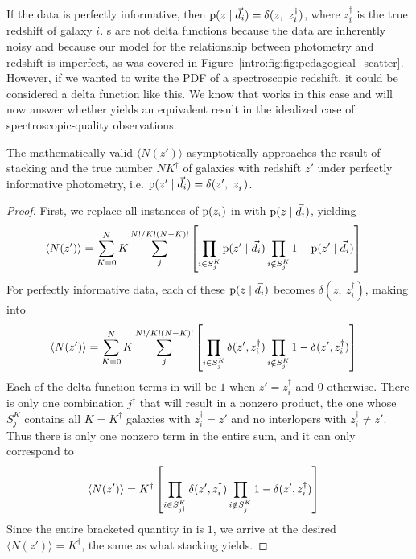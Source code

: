 If the data is perfectly informative, then $\pr{z \gvn \data_{i}} = \delta(z,\ z_{i}^{\dagger})$, where $z_{i}^{\dagger}$ is the true redshift of galaxy $i$.
\Pzpdf s are not delta functions because the data are inherently noisy and because our model for the relationship between photometry and redshift is imperfect, as was covered in Figure~\ref{intro:fig:fig:pedagogical_scatter}.
However, if we wanted to write the PDF of a spectroscopic redshift, it could be considered a delta function like this.
We know that  works in this case and will now answer whether  yields an equivalent result in the idealized case of spectroscopic-quality observations.

\begin{theorem}
	\label{thm:informative}
	The mathematically valid $\langle N(z') \rangle$ asymptotically approaches the result of stacking and the true number $NK^{\dagger}$ of galaxies with redshift $z'$ under perfectly informative photometry, i.e. $\pr{z' \gvn \data_{i}} = \delta(z',\ z^{\dagger}_{i})$.
\end{theorem}
\begin{proof}
	First, we replace all instances of $\mathrm{p}(z_{i})$ in  with $\mathrm{p}(z \mid \vec{d}_{i})$, yielding
	\begin{align}
	\eqlabel{eqn:proofwithdata1}
	\langle N(z') \rangle &= \sum_{K = 0}^{N} K \sum_{j}^{N! / K! (N - K)!} \left[ \prod_{i \in S^{K}_{j}} \pr{z' \gvn \data_{i}} \prod_{i \notin S^{K}_{j}} 1 - \pr{z' \gvn \data_{i}} \right]
	\end{align}
	For perfectly informative data, each of these $\mathrm{p}(z \mid \vec{d}_{i})$ becomes $\delta(z,\ z^{\dagger}_{i})$, making  into
	\begin{align}
	\eqlabel{eqn:proofwithdata2}
	\langle N(z') \rangle &= \sum_{K = 0}^{N} K \sum_{j}^{N! / K! (N - K)!} \left[ \prod_{i \in S^{K}_{j}} \delta(z', z^{\dagger}_{i}) \prod_{i \notin S^{K}_{j}} 1 - \delta(z', z^{\dagger}_{i}) \right]
	\end{align}
	Each of the delta function terms in  will be $1$ when $z' = z^{\dagger}_{i}$ and $0$ otherwise.
	There is only one combination $j^{\dagger}$ that will result in a nonzero product, the one whose $S^{K}_{j}$ contains all $K = K^{\dagger}$ galaxies with $z^{\dagger}_{i} = z'$ and no interlopers with $z^{\dagger}_{i} \neq z'$.
	Thus there is only one nonzero term in the entire sum, and it can only correspond to 
	\begin{align}
	\eqlabel{eqn:proofwithdata3}
	\langle N(z') \rangle &= K^{\dagger} \left[ \prod_{i \in S^{K}_{j^{\dagger}}} \delta(z', z^{\dagger}_{i}) \prod_{i \notin S^{K}_{j^{\dagger}}} 1 - \delta(z', z^{\dagger}_{i}) \right]
	\end{align}
	Since the entire bracketed quantity in  is $1$, we arrive at the desired $\langle N(z') \rangle = K^{\dagger}$, the same as what stacking yields.
\end{proof}

